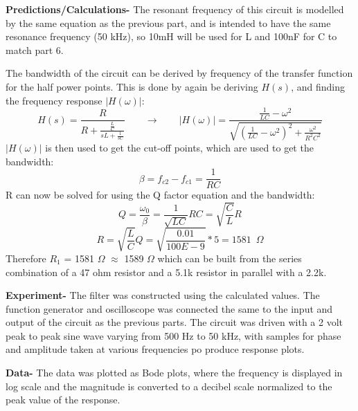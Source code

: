 \documentclass[12pt]{article}
\begin{document}
\textbf{Predictions/Calculations-} The resonant frequency of this circuit is modelled by the same equation as the previous part, and is intended to have the same resonance frequency (50 kHz), so 10mH will be used for L and 100nF for C to match part 6. 

The bandwidth of the circuit can be derived by frequency of the transfer function for the half power points. This is done by again be deriving $H(s)$, and finding the frequency response $|H(\omega)|$:
\begin{equation}
H(s) =\frac{R}{R + \frac{\frac{L}{C}}{sL + \frac{1}{sC}}} \hspace{24pt}\rightarrow\hspace{24pt}|H(\omega)|= \frac{\frac{1}{LC}-\omega^2}{\sqrt{(\frac{1}{LC}-\omega^2)^2 + \frac{\omega^2}{R^2C^2}}}
\end{equation}
$|H(\omega)|$ is then used to get the cut-off points, which are used to get the bandwidth:
\begin{equation}
\beta = f_{c2}-f_{c1} = \frac{1}{RC}
\end{equation}
R can now be solved for using the Q factor equation and the bandwidth:
\begin{equation}
Q = \frac{\omega_0}{\beta}=\frac{1}{\sqrt{LC}}RC= \sqrt{\frac{C}{L}}R
\end{equation}
\begin{equation}
R = \sqrt{\frac{L}{C}}Q= \sqrt{\frac{0.01}{100E-9}}\ast 5= 1581\hspace{6pt}\Omega 
\end{equation}
Therefore $R_1$ = 1581 $\Omega$ $\approx$ 1589 $\Omega$ which can be built from the series combination of a 47 ohm resistor and a 5.1k resistor in parallel with a 2.2k.\\\par 
\textbf{Experiment-} The filter was constructed using the calculated values. The function generator and oscilloscope was connected the same to the input and output of the circuit as the previous parts. The circuit was driven with a 2 volt peak to peak sine wave varying from 500 Hz to 50 kHz, with samples for phase and amplitude taken at various frequencies po produce response plots.\\\par 
\textbf{Data-} The data was plotted as Bode plots, where the frequency is displayed in log scale and the magnitude is converted to a decibel scale normalized to the peak value of the response.
\end{document}
